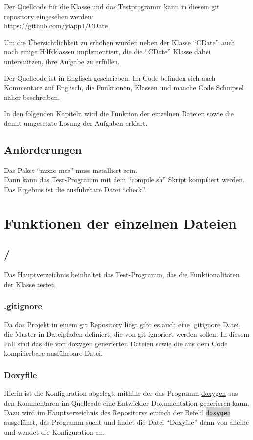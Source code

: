 \documentclass[12pt,pdftex,parskip=half]{scrartcl}
\newcommand{\inlinecode}[2]{\colorbox{lightgray}{\lstinline[language=#1]$#2$}}
\begin{document}
    Der Quellcode für die Klasse und das Testprogramm kann in diesem git repository eingesehen werden:\\
    \href{https://github.com/ylapp1/CDate}{https://github.com/ylapp1/CDate}

    Um die Übersichtlichkeit zu erhöhen wurden neben der Klasse "`CDate"' auch noch einige Hilfsklassen implementiert, die die "`CDate"' Klasse dabei unterstützen, ihre Aufgabe zu erfüllen.

    Der Quellcode ist in Englisch geschrieben.
    Im Code befinden sich auch Kommentare auf Englisch, die Funktionen, Klassen und manche Code Schnipsel näher beschreiben.

    In den folgenden Kapiteln wird die Funktion der einzelnen Dateien sowie die damit umgesetzte Lösung der Aufgaben erklärt.


    \subsection{Anforderungen}
    Das Paket "`mono-mcs"' muss installiert sein.\\
    Dann kann das Test-Programm mit dem "`compile.sh"' Skript kompiliert werden.
    Das Ergebnis ist die ausführbare Datei "`check"'.

    \clearpage


\section{Funktionen der einzelnen Dateien}

    \subsection{/}
    Das Hauptverzeichnis beinhaltet das Test-Programm, das die Funktionalitäten der Klasse testet.

      \subsubsection{.gitignore}
      Da das Projekt in einem git Repository liegt gibt es auch eine .gitignore Datei, die Muster in Dateipfaden definiert, die von git ignoriert werden sollen. In diesem Fall sind das die von doxygen generierten Dateien sowie die aus dem Code kompilierbare ausführbare Datei.

      \subsubsection{Doxyfile}
      Hierin ist die Konfiguration abgelegt, mithilfe der das Programm \href{http://www.doxygen.nl/}{doxygen} aus den Kommentaren im Quellcode eine Entwickler-Dokumentation generieren kann.
      Dazu wird im Hauptverzeichnis des Repositorys einfach der Befehl \inlinecode{bash}{doxygen} ausgeführt, das Programm sucht und findet die Datei "`Doxyfile"' dann von alleine und wendet die Konfiguration an.
\end{document}

